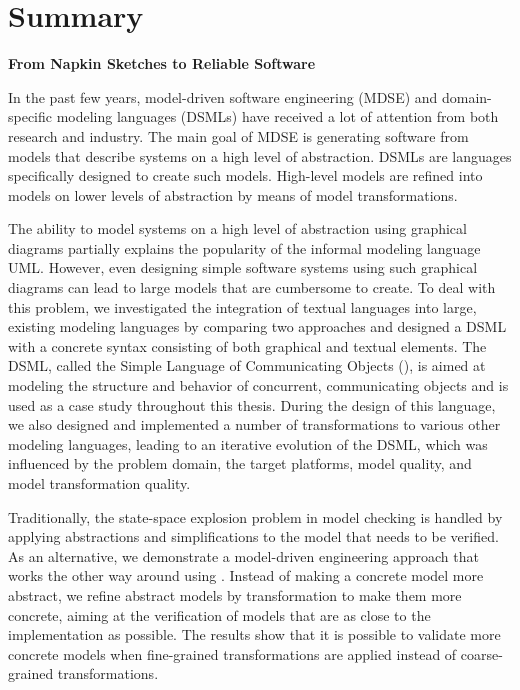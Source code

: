 \chapter{Summary}
\vspace{-\baselineskip}
\begin{center}
 \Large \bf
 From Napkin Sketches to Reliable Software
\end{center}

\noindent
In the past few years, model-driven software engineering (MDSE) and domain-specific modeling languages (DSMLs) have received a lot of attention from both research and industry.
The main goal of MDSE is generating software from models that describe systems on a high level of abstraction.
DSMLs are languages specifically designed to create such models.
High-level models are refined into models on lower levels of abstraction by means of model transformations.

The ability to model systems on a high level of abstraction using graphical diagrams partially explains the popularity of the informal modeling language UML.
However, even designing simple software systems using such graphical diagrams can lead to large models that are cumbersome to create.
To deal with this problem, we investigated the integration of textual languages into large, existing modeling languages by comparing two approaches and designed a DSML with a concrete syntax consisting of both graphical and textual elements.
The DSML, called the Simple Language of Communicating Objects (\SLCO), is aimed at modeling the structure and behavior of concurrent, communicating objects and is used as a case study throughout this thesis.
During the design of this language, we also designed and implemented a number of transformations to various other modeling languages, leading to an iterative evolution of the DSML, which was influenced by the problem domain, the target platforms, model quality, and model transformation quality.

Traditionally, the state-space explosion problem in model checking is handled by applying abstractions and simplifications to the model that needs to be verified.
As an alternative, we demonstrate a model-driven engineering approach that works the other way around using \SLCO.
Instead of making a concrete model more abstract, we refine abstract models by transformation to make them more concrete, aiming at the verification of models that are as close to the implementation as possible.
The results show that it is possible to validate more concrete models when fine-grained transformations are applied instead of coarse-grained transformations.

